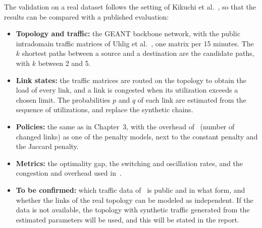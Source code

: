 \documentclass[11pt,a4paper]{article}
\begin{document}
The validation on a real dataset follows the setting of Kikuchi et al.~\cite{kikuchi2025}, so that the results can be compared with a published evaluation:
\begin{itemize}[leftmargin=*]
  \item \textbf{Topology and traffic:} the GEANT backbone network, with the public intradomain traffic matrices of Uhlig et al.~\cite{uhlig2006}, one matrix per 15 minutes. The $k$ shortest paths between a source and a destination are the candidate paths, with $k$ between 2 and 5.
  \item \textbf{Link states:} the traffic matrices are routed on the topology to obtain the load of every link, and a link is congested when its utilization exceeds a chosen limit. The probabilities $p$ and $q$ of each link are estimated from the sequence of utilizations, and replace the synthetic chains.
  \item \textbf{Policies:} the same as in Chapter~3, with the overhead of~\cite{kikuchi2025} (number of changed links) as one of the penalty models, next to the constant penalty and the Jaccard penalty.
  \item \textbf{Metrics:} the optimality gap, the switching and oscillation rates, and the congestion and overhead used in~\cite{kikuchi2025}.
  \item \textbf{To be confirmed:} which traffic data of~\cite{kikuchi2025} is public and in what form, and whether the links of the real topology can be modeled as independent. If the data is not available, the topology with synthetic traffic generated from the estimated parameters will be used, and this will be stated in the report.
\end{itemize}


\nocite{mckeown2008,ramalingam1996}

\end{document}
